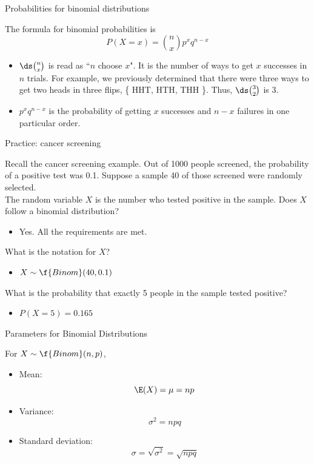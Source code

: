 \documentclass[xcolor=table, handout]{beamer}
\begin{document}
\begin{frame}{Probabilities for binomial distributions}
\begin{block}{}
The formula for binomial probabilities is
\[ P(X=x) = \binom n x p^x q^{n-x}\]
\begin{itemize}
\pause\item $\ds \binom n x$ is read as ``$n$ choose $x$". It is the number of ways to get $x$ successes in $n$ trials. For example, we previously determined that there were three ways to get two heads in three flips, \{ HHT, HTH, THH \}. Thus, $\ds \binom 3 2$ is 3.
\pause\item $p^x q^{n-x}$ is the probability of getting $x$ successes and $n-x$ failures in one particular order.
\end{itemize}
\end{block}
\end{frame}

\begin{frame}{Practice: cancer screening}
\begin{block}{}
Recall the cancer screening example. Out of 1000 people screened, the probability of a positive test was 0.1. Suppose a sample 40 of those screened were randomly selected.\\
\medskip
\pause
The random variable $X$ is the number who tested positive in the sample. Does $X$ follow a binomial distribution?
\begin{itemize}
\pause\item Yes. All the requirements are met.
\end{itemize}
\medskip
\pause
What is the notation for $X$?
\begin{itemize}
\pause\item $X \sim \f{Binom}(40, 0.1)$
\end{itemize}
\medskip
\pause
What is the probability that exactly 5 people in the sample tested positive?
\begin{itemize}
\pause\item $P(X=5) = 0.165$
\end{itemize}
\end{block}
\end{frame}


\begin{frame}{Parameters for Binomial Distributions}
\begin{block}{}
For $X \sim \f{Binom}(n,p)$,
\begin{itemize}
\pause\item Mean:
\[ \E(X) = \mu = np\]
\vspace*{-\baselineskip}\pause\item Variance:
\[\sigma^2 = npq\]
\vspace*{-\baselineskip}\pause\item Standard deviation:
\[\sigma = \sqrt{\sigma^2} = \sqrt{npq}\]
\end{itemize}
\end{block}
\end{frame}
\end{document}
